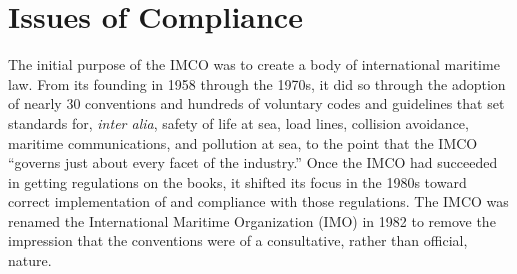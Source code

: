 \documentclass[twoside,symmetric,notoc]{tufte-book}
\begin{document}
\section{Issues of Compliance}
\par{%
The initial purpose of the IMCO was to create a body of international maritime law. From its founding in 1958 through the 1970s, it did so through the adoption of nearly 30 conventions and hundreds of voluntary codes and guidelines that set standards for, \textit{inter alia}, safety of life at sea, load lines, collision avoidance, maritime communications, and pollution at sea,\cite[-0.3in]{Srivastava} to the point that the IMCO ``governs just about every facet of the industry.''\cite{IMO_2016} Once the IMCO had succeeded in getting regulations on the books, it shifted its focus in the 1980s toward correct implementation of and compliance with those regulations.\cite{Mitroussi} The IMCO was renamed the International Maritime Organization (IMO) in 1982 to remove the impression that the conventions were of a consultative, rather than official, nature.
}
\end{document}
